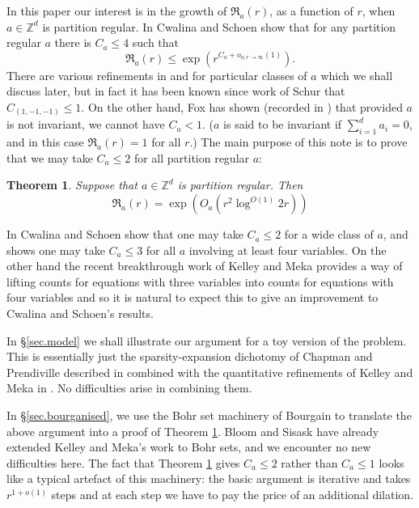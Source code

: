 \documentclass[12pt,reqno]{amsart}
\newtheorem{theorem}[subsection]{Theorem}
\providecommand{\Z}{\mathbb{Z}}
\numberwithin{equation}{section}
\begin{document}
In this paper our interest is in the growth of $\mathfrak{R}_a(r)$, as a function of $r$, when $a\in \Z^d$ is partition regular. In \cite[Theorem 1.5]{cwasch::0} Cwalina and Schoen show that for any partition regular $a$ there is $C_a\leq 4$ such that 
\begin{equation}\label{eqn.upper}
\mathfrak{R}_a(r) \leq \exp(r^{C_a+o_{a;r \rightarrow \infty}(1)}).
\end{equation}
There are various refinements in \cite{cwasch::0} and \cite{Kosciuszko:2025aa} for particular classes of $a$ which we shall discuss later, but in fact it has been known since work of Schur \cite[p114, Hilfssatz]{sch::4} that $C_{(1,-1,-1)}\leq 1$.  On the other hand, Fox has shown (recorded in \cite[Theorem 5]{foxkle::}) that provided $a$ is not invariant, we cannot have $C_a<1$. ($a$ is said to be invariant if $\sum_{i=1}^d{a_i}=0$, and in this case $\mathfrak{R}_a(r)=1$ for all $r$.) The main purpose of this note is to prove that we may take $C_a \leq 2$ for all partition regular $a$:
\begin{theorem}\label{thm.mn}
Suppose that $a \in \Z^d$ is partition regular.  Then
\begin{equation*}
\mathfrak{R}_a(r) = \exp(O_a(r^2\log^{O(1)}2r))
\end{equation*}
\end{theorem}
In \cite[Theorem 1.7]{cwasch::0} Cwalina and Schoen show that one may take $C_a \leq 2$ for a wide class of $a$, and \cite[Theorem 1.6]{cwasch::0} shows one may take $C_a \leq 3$ for all $a$ involving at least four variables. On the other hand the recent breakthrough work of Kelley and Meka \cite{kelmek::0} provides a way of lifting counts for equations with three variables into counts for equations with four variables and so it is natural to expect this to give an improvement to Cwalina and Schoen's results. 

In \S\ref{sec.model} we shall illustrate our argument for a toy version of the problem. This is essentially just the sparsity-expansion dichotomy of Chapman and Prendiville described in \cite[Lemma 2.3]{chapre::} combined with the quantitative refinements of Kelley and Meka in \cite[Lemma 1.5]{kelmek::0}. No difficulties arise in combining them.

In \S\ref{sec.bourganised}, we use the Bohr set machinery of Bourgain \cite{bou::5} to translate the above argument into a proof of Theorem \ref{thm.mn}. Bloom and Sisask \cite{Bloom:2023aa} have already extended Kelley and Meka's work to Bohr sets, and we encounter no new difficulties here. The fact that Theorem \ref{thm.mn} gives $C_a\leq 2$ rather than $C_a\leq 1$ looks like a typical artefact of this machinery: the basic argument is iterative and takes $r^{1+o(1)}$ steps and at each step we have to pay the price of an additional dilation. 
\end{document}
